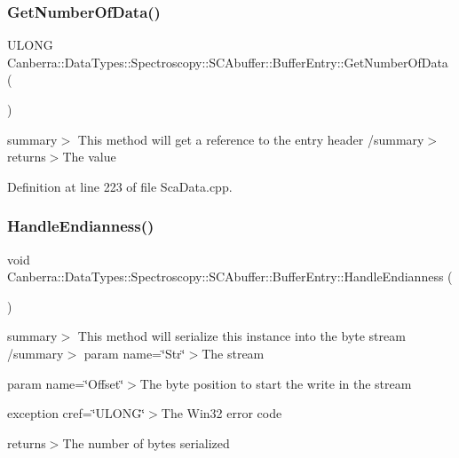 \subsubsection{\texorpdfstring{Get\+Number\+Of\+Data()}{GetNumberOfData()}}
{\footnotesize\ttfamily U\+L\+O\+NG Canberra\+::\+Data\+Types\+::\+Spectroscopy\+::\+S\+C\+Abuffer\+::\+Buffer\+Entry\+::\+Get\+Number\+Of\+Data (\begin{DoxyParamCaption}{ }\end{DoxyParamCaption})}

summary$>$ This method will get a reference to the entry header /summary$>$ returns$>$The value

Definition at line 223 of file Sca\+Data.\+cpp.

\mbox{\label{class_canberra_1_1_data_types_1_1_spectroscopy_1_1_s_c_abuffer_1_1_buffer_entry_abb874f7cb212076fa6b354e140f8c490_abb874f7cb212076fa6b354e140f8c490}} 
\subsubsection{\texorpdfstring{Handle\+Endianness()}{HandleEndianness()}}
{\footnotesize\ttfamily void Canberra\+::\+Data\+Types\+::\+Spectroscopy\+::\+S\+C\+Abuffer\+::\+Buffer\+Entry\+::\+Handle\+Endianness (\begin{DoxyParamCaption}{ }\end{DoxyParamCaption})\hspace{0.3cm}{\ttfamily [protected]}}

summary$>$ This method will serialize this instance into the byte stream /summary$>$ param name=\char`\"{}\+Str\char`\"{}$>$The stream

param name=\char`\"{}\+Offset\char`\"{}$>$The byte position to start the write in the stream

exception cref=\char`\"{}\+U\+L\+O\+N\+G\char`\"{}$>$The Win32 error code

returns$>$The number of bytes serialized

